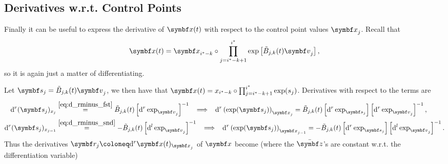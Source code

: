\subsection{Derivatives w.r.t. Control Points}

Finally it can be useful to express the derivative of $\x(t)$ with respect to the control point values $\x_j$. Recall that
\begin{equation}
  \x(t) = \x_{i^* - k} \circ \prod_{j = i^* - k + 1}^{i^*} \exp \left[ \tilde B_{j, k}(t) \bv_j \right],
\end{equation}
so it is again just a matter of differentiating.

Let $\symbf s_j = \tilde B_{j, k}(t) \bv_j$, we then have that $\x(t) = x_{i^* - k} \circ \prod_{j=i^* - k + 1}^{i^*} \exp(s_j)$.  Derivatives with respect to the terms are
\begin{subequations}
  \label{eq:dr_sj}
  \begin{align}
    \label{eq:dr_sj_xj}
    \mathrm{d}^r (\symbf s_j)_{x_j}     & \overset{\eqref{eq:d_rminus_fst}} = \tilde B_{j, k}(t) \left[ \mathrm{d}^r \exp_{\bv_j} \right]^{-1} \; \; \implies \; \; \mathrm{d}^r \left(\exp (\symbf s_j) \right)_{\x_j} = \tilde B_{j, k}(t) \left[\mathrm{d}^r \exp_{\symbf s_j} \right]  \left[ \mathrm{d}^r \exp_{\bv_j} \right]^{-1},         \\
    \label{eq:dr_sj_xjm}
    \mathrm{d}^r (\symbf s_j)_{x_{j-1}} & \overset{\eqref{eq:d_rminus_snd}} = - \tilde B_{j, k}(t) \left[ \mathrm{d}^l \exp_{\bv_j} \right]^{-1} \; \; \implies \; \; \mathrm{d}^r \left( \exp(\symbf s_j) \right)_{\x_{j-1}} = - \tilde B_{j, k}(t)  \left[ \mathrm{d}^r \exp_{\symbf s_j} \right]\left[ \mathrm{d}^l \exp_{\bv_j} \right]^{-1}.
  \end{align}
\end{subequations}
Thus the derivatives $\symbf r_j \coloneq \mathrm{d}^r \x(t)_{\x_j}$ of $\x$ become (where the $\bar \z$'s are constant w.r.t. the differentiation variable)
